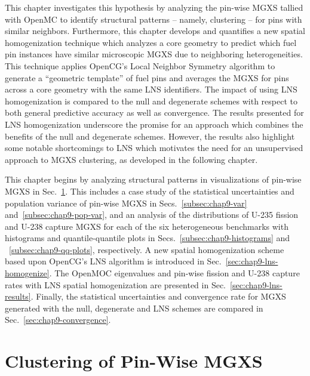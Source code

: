 This chapter investigates this hypothesis by analyzing the pin-wise \ac{MGXS} tallied with OpenMC to identify structural patterns -- namely, clustering -- for pins with similar neighbors. Furthermore, this chapter develops and quantifies a new spatial homogenization technique which analyzes a core geometry to predict which fuel pin instances have similar microscopic \ac{MGXS} due to neighboring heterogeneities. This technique applies OpenCG's Local Neighbor Symmetry algorithm to generate a ``geometric template'' of fuel pins and averages the \ac{MGXS} for pins across a core geometry with the same \ac{LNS} identifiers. The impact of using \ac{LNS} homogenization is compared to the null and degenerate schemes with respect to both general predictive accuracy as well as convergence. The results presented for \ac{LNS} homogenization underscore the promise for an approach which combines the benefits of the null and degenerate schemes. However, the results also highlight some notable shortcomings to \ac{LNS} which motivates the need for an unsupervised approach to \ac{MGXS} clustering, as developed in the following chapter.

This chapter begins by analyzing structural patterns in visualizations of pin-wise \ac{MGXS} in Sec.~\ref{sec:chap9-clustering}. This includes a case study of the statistical uncertainties and population variance of pin-wise \ac{MGXS} in Secs.~\ref{subsec:chap9-var} and~\ref{subsec:chap9-pop-var}, and an analysis of the distributions of U-235 fission and U-238 capture \ac{MGXS} for each of the six heterogeneous benchmarks with histograms and quantile-quantile plots in Secs.~\ref{subsec:chap9-histograms} and ~\ref{subsec:chap9-qq-plots}, respectively. A new spatial homogenization scheme based upon OpenCG's \ac{LNS} algorithm is introduced in Sec.~\ref{sec:chap9-lns-homogenize}. The OpenMOC eigenvalues and pin-wise fission and U-238 capture rates with \ac{LNS} spatial homogenization are presented in Sec.~\ref{sec:chap9-lns-results}. Finally, the statistical uncertainties and convergence rate for \ac{MGXS} generated with the null, degenerate and \ac{LNS} schemes are compared in Sec.~\ref{sec:chap9-convergence}.


\section{Clustering of Pin-Wise MGXS}
\label{sec:chap9-clustering}

